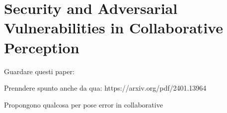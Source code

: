 
\section{Security and Adversarial Vulnerabilities in Collaborative Perception}

Guardare questi paper: \cite{wang2025rcdnrobustcamerainsensitivitycollaborative}

Prenndere spunto anche da qua: https://arxiv.org/pdf/2401.13964


Propongono qualcosa per pose error in collaborative \cite{lu2023robustcollaborative3dobject}\cite{vadivelu2020learningcommunicatecorrectpose}
